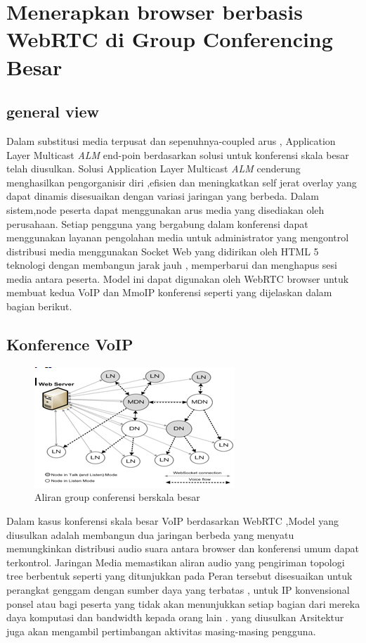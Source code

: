 \documentclass{jtetiproposalskripsi}
\begin{document}
\section{Menerapkan browser berbasis WebRTC di Group Conferencing Besar}
\subsection{general view}
Dalam substitusi media terpusat dan sepenuhnya-coupled arus , Application Layer Multicast \emph{ALM} end-poin berdasarkan solusi untuk konferensi skala besar telah diusulkan.  Solusi Application Layer Multicast \emph{ALM} cenderung menghasilkan pengorganisir diri ,efisien dan meningkatkan self jerat overlay yang dapat dinamis disesuaikan dengan variasi jaringan yang berbeda. Dalam sistem,node peserta dapat menggunakan arus media yang disediakan oleh perusahaan. Setiap pengguna yang bergabung dalam konferensi dapat menggunakan layanan pengolahan media untuk administrator yang mengontrol distribusi media menggunakan Socket Web yang didirikan oleh HTML 5 teknologi dengan membangun jarak jauh , memperbarui dan menghapus sesi media antara peserta. Model ini dapat digunakan oleh WebRTC browser untuk membuat kedua VoIP dan MmoIP konferensi seperti yang dijelaskan dalam bagian berikut.
\subsection{Konference VoIP}
\begin{figure}[ht!]
\centering
    \includegraphics{gambar/voip}
    \caption{ Aliran group conferensi berskala besar}
    \label{wsn}
\end{figure}
Dalam kasus konferensi skala besar VoIP berdasarkan WebRTC ,Model yang diusulkan adalah membangun dua jaringan berbeda yang menyatu memungkinkan distribusi audio suara antara browser dan konferensi umum dapat terkontrol. Jaringan Media memastikan aliran audio yang pengiriman topologi tree berbentuk seperti yang ditunjukkan pada Peran tersebut disesuaikan untuk perangkat genggam dengan sumber daya yang terbatas , untuk IP konvensional ponsel atau bagi peserta yang tidak akan menunjukkan setiap bagian dari mereka daya komputasi dan bandwidth kepada orang lain . yang diusulkan Arsitektur juga akan mengambil pertimbangan aktivitas masing-masing pengguna.
\end{document}
